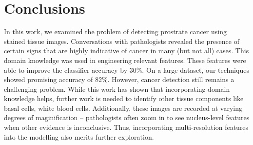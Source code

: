 \section{Conclusions}
\label{sec:conclusions}

In this work, we examined the problem of detecting prostrate cancer using stained tissue images. Conversations with pathologists revealed the presence of certain signs that are highly indicative of cancer in many (but not all) cases. This domain knowledge was used in engineering relevant features. These features were able to improve the classifier accuracy by 30\%. On a large dataset, our techniques showed promising accuracy of 82\%. However, cancer detection still remains a challenging problem. While this work has shown that incorporating domain knowledge helps, further work is needed to identify other tissue components like basal cells, white blood cells. Additionally, these images are recorded at varying degrees of maginification -- pathologists often zoom in to see nucleus-level features when other evidence is inconclusive. Thus, incorporating multi-resolution features into the modelling also merits further exploration. 
